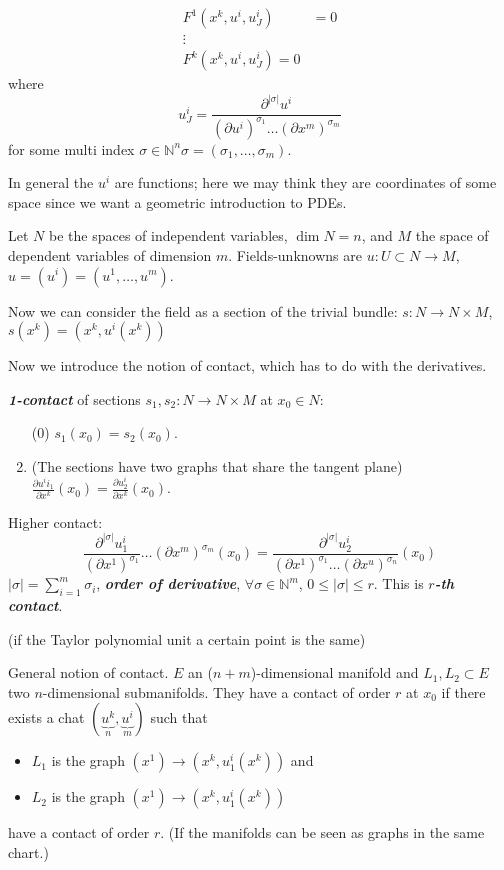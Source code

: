 \begin{align*}
F^1(x^k,u^i,u^i_J)&=0\\
\vdots \\
F^k(x^k,u^i,u^i_J)=0
\end{align*}
where
\[u^i_J=\frac{\partial^{|\sigma|}u^i}{(\partial u^i)^{\sigma_1}\ldots(\partial x^m)^{\sigma_m}}\]
for some multi index $\sigma \in \mathbb{N}^n\sigma=(\sigma_1,\ldots,\sigma_m)$.

In general the $u^i$ are functions; here we may think they are coordinates of some space since we want a geometric introduction to PDEs.

Let $N$ be the spaces of independent variables, $\dim N=n$, and  $M$ the space of dependent variables of dimension $m$. Fields-unknowns are $u:U \subset N \to M$, $u=(u^i)=(u^1,\ldots,u^m)$.

Now we can consider the field as a section of the trivial bundle: $s:N \to N\times M$, $s(x^k)=(x^k,u^i(x^k))$

Now we introduce the notion of contact, which has to do with the derivatives.

\textit{\textbf{1-contact}} of sections $s_1,s_2:N \to N \times M$ at $x_0  \in N$:
\begin{enumerate}
	\item[(0)] $s_1(x_0)=s_2(x_0)$.
	\item (The sections have two graphs that share the tangent plane) $\frac{\partial u^ii_1}{\partial x^k}(x_0)=\frac{\partial u^i_2}{\partial x^k}(x_0)$.
\end{enumerate}

Higher contact:
\[\frac{\partial^{|\sigma|}u^i_1}{(\partial x^1)^{\sigma_1}}\ldots(\partial x^m)^{\sigma_m}(x_0)=\frac{\partial^{|\sigma|}u_2^i}{(\partial x^1)^{\sigma_1}\ldots(\partial x^u)^{\sigma_n}}(x_0)\]
$|\sigma|=\sum_{i=1}^m \sigma_i$, \textit{\textbf{order of derivative}},  $\forall  \sigma \in \mathbb{N}^m$, $0\leq  | \sigma|\leq  r$. This is \textit{\textbf{$r$-th contact}}.

(if the Taylor polynomial unit a certain point is the same)

General notion of contact. $E$ an  ($n+m$)-dimensional manifold and  $L_1,L_2 \subset E$ two $n$-dimensional submanifolds. They have a contact of order $r$ at $x_0$ if there exists a chat $(\underbrace{u^k}_{n},\underbrace{u^i}_{m})$ such that
\begin{itemize}
\item $L_1$ is the graph $(x^1)\to (x^k,u^i_1(x^k))$ and
\item $L_2$ is the graph $(x^1) \to (x^k,u^i_1(x^k))$
\end{itemize}
have a contact of order $r$. (If the manifolds can be seen as graphs in the same chart.)

